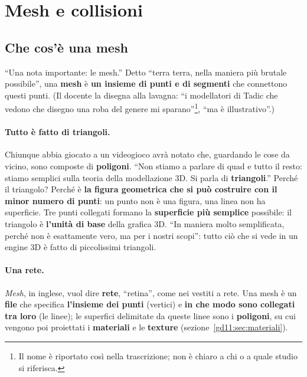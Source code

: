 \section{Mesh e collisioni}
\label{gd11:sec:mesh}

\subsection{Che cos'è una mesh}

``Una nota importante: le mesh.'' Detto ``terra terra, nella maniera più
brutale possibile'', una \textbf{mesh} è \textbf{un insieme di punti e di
segmenti} che connettono questi punti. (Il docente la disegna alla lavagna:
``i modellatori di Tadic che vedono che disegno una roba del genere mi
sparano''\footnote{Il nome è riportato così nella trascrizione; non è chiaro a
chi o a quale studio si riferisca.}, ``ma è illustrativo''.)

\paragraph{Tutto è fatto di triangoli.} Chiunque abbia giocato a un videogioco
avrà notato che, guardando le cose da vicino, sono composte di
\textbf{poligoni}. ``Non stiamo a parlare di quad e tutto il resto: stiamo
semplici sulla teoria della modellazione 3D. Si parla di \textbf{triangoli}.''
Perché il triangolo? Perché è \textbf{la figura geometrica che si può costruire
con il minor numero di punti}: un punto non è una figura, una linea non ha
superficie. Tre punti collegati formano la \textbf{superficie più semplice}
possibile: il triangolo è \textbf{l'unità di base} della grafica 3D. ``In
maniera molto semplificata, perché non è esattamente vero, ma per i nostri
scopi'': tutto ciò che si vede in un engine 3D è fatto di piccolissimi
triangoli.

\paragraph{Una rete.} \emph{Mesh}, in inglese, vuol dire \textbf{rete},
``retina'', come nei vestiti a rete. Una mesh è un \textbf{file} che specifica
\textbf{l'insieme dei punti} (vertici) e \textbf{in che modo sono collegati tra
loro} (le linee); le superfici delimitate da queste linee sono i
\textbf{poligoni}, su cui vengono poi proiettati i \textbf{materiali} e le
\textbf{texture} (sezione~\ref{gd11:sec:materiali}).

